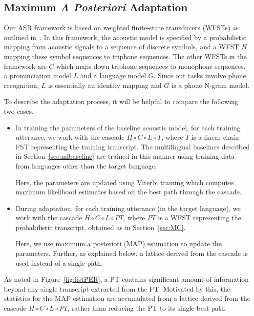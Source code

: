 
\subsection{Maximum {\em A Posteriori} Adaptation}
\label{sec:adaptation}

Our ASR framework is based on weighted finite-state transducers (WFSTs) as outlined in~\cite{mohri2008speech}. 
In this framework, the acoustic model is specified by a probabilistic mapping from acoustic signals to a sequence of discrete symbols, and a WFST $H$ mapping these symbol sequences to triphone sequences. The other WFSTs in the framework are $C$ which maps down triphone sequences to monophone sequences, a pronunciation model $L$ and a language model $G$. Since our tasks involve phone recognition, $L$ is essentially an identity mapping and $G$ is a phone N-gram model. 

To describe the adaptation process, it will be helpful to compare the following two cases.
\begin{itemize}
\item In training the parameters of the baseline acoustic model, for each training utterance, we work with the cascade $H \circ C \circ L \circ T$, where $T$ is a linear chain FST representing the training transcript. The multilingual baselines described in Section~\ref{sec:mlbaseline} are trained in this manner using training data from languages other than the target language.

  Here, the parameters are updated using Viterbi training which computes maximum likelihood estimates based on the best path through the cascade.

\item During adaptation, for each training utterance (in the target language), we work with the cascade $H \circ C \circ L \circ PT$, where $PT$ is a WFST representing the probabilistic transcript, obtained as in Section~\ref{sec:MC}.

Here, we use maximum a posteriori (MAP) estimation to update the parameters. Further, as explained below, a lattice derived from the cascade is used instead of a single path.
\end{itemize}

As noted in Figure~\ref{fig:listPER}, a PT contains significant amount of information beyond any single transcript extracted from the PT. Motivated by this, the statistics for the MAP estimation are accumulated from a lattice derived from the cascade $H \circ C \circ L \circ PT$, rather than reducing the PT to its single best path.

